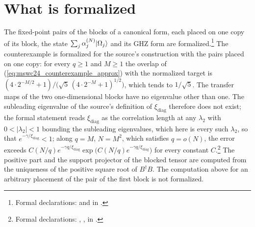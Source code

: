 \documentclass{article}
\begin{document}
\section{What is formalized}
The fixed-point pairs of the blocks of a canonical form, each placed on one copy
of its block, the state $\sum_j\alpha^{(N)}_j|\Omega_j\rangle$ and its GHZ form are
formalized.\footnote{Formal declarations:
     and
     in
    .}
The counterexample is formalized for the source's construction with the pairs
placed on one copy: for every $q\geq1$ and $M\geq1$ the overlap of
(\ref{eq:mswc24_counterexample_approx}) with the normalized target is
$(4\cdot2^{-M/2}+1)/\bigl(\sqrt5\,(4\cdot2^{-M}+1)^{1/2}\bigr)$, which tends to
$1/\sqrt5$. The transfer maps of the two one-dimensional blocks have no eigenvalue
other than one. The subleading eigenvalue of the source's definition of
$\xi_{\mathrm{diag}}$ therefore does not exist; the formal statement reads
$\xi_{\mathrm{diag}}$ as the correlation length at any $\lambda_2$ with
$0<\lvert\lambda_2\rvert<1$ bounding the subleading eigenvalues, which here is
every such $\lambda_2$, so that $e^{-\gamma/\xi_{\mathrm{diag}}}<1$; along $q=M$,
$N=M^2$, which satisfies $q=o(N)$, the error exceeds
$C(N/q)e^{-\gamma q/\xi_{\mathrm{diag}}}\exp\bigl(C(N/q)e^{-\gamma
            q/\xi_{\mathrm{diag}}}\bigr)$ for every constant $C$.\footnote{Formal declarations:
    ,
    ,
     in
    .}
The positive part and the support projector of the blocked tensor are computed
from the uniqueness of the positive square root of $B^\dagger B$. The computation
above for an arbitrary placement of the pair of the first block is not formalized.
\end{document}
